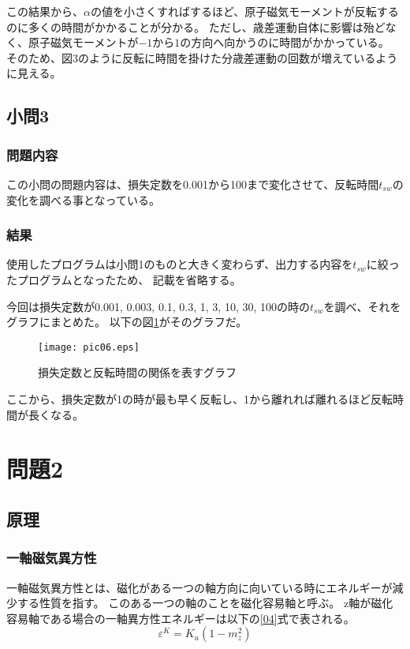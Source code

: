 \documentclass{jsarticle}
\begin{document}
この結果から、$\alpha$の値を小さくすればするほど、原子磁気モーメントが反転するのに多くの時間がかかることが分かる。
ただし、歳差運動自体に影響は殆どなく、原子磁気モーメントが$-1$から$1$の方向へ向かうのに時間がかかっている。
そのため、図3のように反転に時間を掛けた分歳差運動の回数が増えているように見える。

\subsection{小問3}
\subsubsection{問題内容}
この小問の問題内容は、損失定数を0.001から100まで変化させて、反転時間$t_{sw}$の変化を調べる事となっている。

\subsubsection{結果}
使用したプログラムは小問1のものと大きく変わらず、出力する内容を$t_{sw}$に絞ったプログラムとなったため、
記載を省略する。

今回は損失定数が0.001, 0.003, 0.1, 0.3, 1, 3, 10, 30, 100の時の$t_{sw}$を調べ、それをグラフにまとめた。
以下の図\ref{fig04}がそのグラフだ。
\begin{figure}[H]
	\centering
	\texttt{[image: pic06.eps]}
	\caption{損失定数と反転時間の関係を表すグラフ}
	\label{fig04}
\end{figure}
ここから、損失定数が1の時が最も早く反転し、1から離れれば離れるほど反転時間が長くなる。

\section{問題2}
\subsection{原理}
\subsubsection{一軸磁気異方性}
一軸磁気異方性とは、磁化がある一つの軸方向に向いている時にエネルギーが減少する性質を指す。
このある一つの軸のことを磁化容易軸と呼ぶ。
z軸が磁化容易軸である場合の一軸異方性エネルギーは以下の\ref{04}式で表される。
\begin{equation}
	\varepsilon^K = K_u(1-m_z^2)
	\label{04}
\end{equation}
\end{document}
